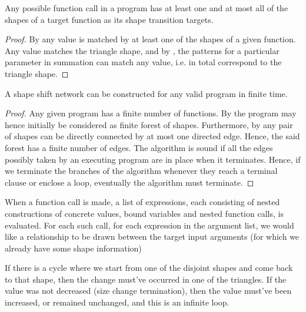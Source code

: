 \begin{lemma}\label{lemma:extend-any-call-targets} Any possible function call in a program has at least one and at
most all of the shapes of a target function as its shape transition
targets.\end{lemma}

\begin{proof} By  any value is
matched by at least one of the shapes of a given function. Any value matches
the triangle shape, and by , the
patterns for a particular parameter in summation can match any value, i.e. in
total correspond to the triangle shape.\end{proof}

\begin{theorem} A shape shift network can be constructed for any valid program
in finite time.\end{theorem}

\begin{proof} Any given program has a finite number of functions. By
 the program may hence initially be
considered as finite forest of shapes. Furthermore, by
 any pair of shapes can be directly
connected by at most one directed edge. Hence, the said forest has a finite
number of edges. The algorithm is sound if all the edges possibly taken by an
executing program are in place when it terminates.  Hence, if we terminate the
branches of the algorithm whenever they reach a terminal clause or enclose a
loop, eventually the algorithm must terminate.\end{proof}


When a function call is made, a list of expressions, each consisting of nested
constructions of concrete values, bound variables and nested function calls, is
evaluated. For each such call, for each expression in the argument list, we
would like a relationship to be drawn between the target input arguments (for
which we already have some shape information) 





If there is a cycle where we start from one of the disjoint shapes and come
back to that shape, then the change must've occurred in one of the triangles.
If the value was not decreased (size change termination), then the value
must've been increased, or remained unchanged, and this is an infinite loop.



